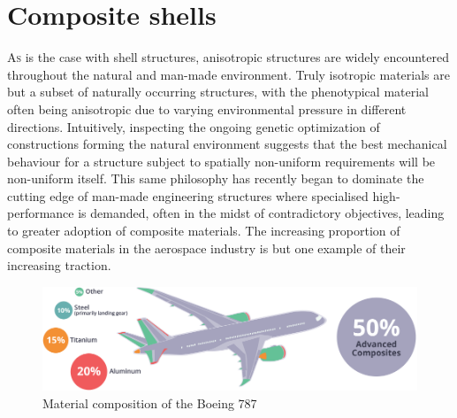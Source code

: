 



\chapter{Composite shells}
\label{chap:chapter_2_1}

\renewcommand{\Thema}{Composite shells}

\lettrine[lines=2]{A}{s} is the case with shell structures, anisotropic structures are widely encountered throughout the natural and man-made environment. Truly isotropic materials are but a subset of naturally occurring structures, with the phenotypical material often being anisotropic due to varying environmental pressure in different directions. Intuitively, inspecting the ongoing genetic optimization of constructions forming the natural environment suggests that the best mechanical behaviour for a structure subject to spatially non-uniform requirements will be non-uniform itself. This same philosophy has recently began to dominate the cutting edge of man-made engineering structures where specialised high-performance is demanded, often in the midst of contradictory objectives, leading to greater adoption of composite materials. The increasing proportion of composite materials in the aerospace industry is but one example of their increasing traction.

\begin{figure}[H]
	\centering
	\def\svgwidth{\columnwidth}
	\includegraphics[width=14cm]{images/composites_aerospace.png}
	\caption{Material composition of the Boeing 787 \cite{AMCA2017}}
	\label{composite_aerospace}
\end{figure}

